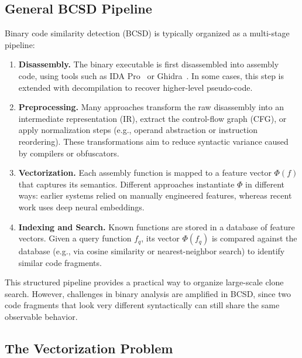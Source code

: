 \subsection{General BCSD Pipeline}


Binary code similarity detection (BCSD) is typically organized as a multi-stage pipeline:

\begin{enumerate}
    \item \textbf{Disassembly.} The binary executable is first disassembled into assembly code, using tools such as IDA Pro~\cite{ida} or Ghidra~\cite{ghidra}. In some cases, this step is extended with decompilation to recover higher-level pseudo-code.

    \item \textbf{Preprocessing.} Many approaches transform the raw disassembly into an intermediate representation (IR), extract the control-flow graph (CFG), or apply normalization steps (e.g., operand abstraction or instruction reordering). These transformations aim to reduce syntactic variance caused by compilers or obfuscators.

    \item \textbf{Vectorization.} Each assembly function is mapped to a feature vector $\Phi(f)$ that captures its semantics. Different approaches instantiate $\Phi$ in different ways: earlier systems relied on manually engineered features, whereas recent work uses deep neural embeddings.

    \item \textbf{Indexing and Search.} Known functions are stored in a database of feature vectors. Given a query function $f_q$, its vector $\Phi(f_q)$ is compared against the database (e.g., via cosine similarity or nearest-neighbor search) to identify similar code fragments.
\end{enumerate}

This structured pipeline provides a practical way to organize large-scale clone search. However, challenges in binary analysis are amplified in BCSD, since two code fragments that look very different syntactically can still share the same observable behavior.

\subsection{The Vectorization Problem}

